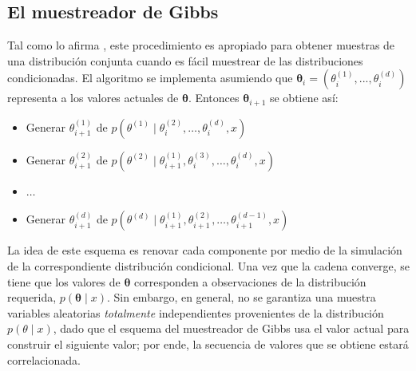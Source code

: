 \documentclass[
  10pt,
  spanish,
]{book}
\providecommand{\tightlist}{%
  \setlength{\itemsep}{0pt}\setlength{\parskip}{0pt}}
\theoremstyle{definition}
\theoremstyle{definition}
\theoremstyle{definition}
\theoremstyle{definition}
\theoremstyle{remark}
\begin{document}
\hypertarget{el-muestreador-de-gibbs}{%
\subsection{El muestreador de Gibbs}\label{el-muestreador-de-gibbs}}

Tal como lo afirma \citet{Pena2002}, este procedimiento es apropiado para obtener muestras de una distribución
conjunta cuando es fácil muestrear de las distribuciones condicionadas. El algoritmo se implementa asumiendo que \(\boldsymbol \theta_i=(\theta^{(1)}_i, . . . , \theta^{(d)}_i)\) representa a los valores actuales de \(\boldsymbol \theta\). Entonces \(\boldsymbol \theta_{i+1}\) se obtiene así:

\begin{itemize}
\tightlist
\item
  Generar \(\theta^{(1)}_{i+1}\) de \(p(\theta^{(1)} \mid \theta^{(2)}_i, \ldots,\theta^{(d)}_i,x)\)
\item
  Generar \(\theta^{(2)}_{i+1}\) de \(p(\theta^{(2)} \mid \theta^{(1)}_{i+1}, \theta^{(3)}_i, \ldots , \theta^{(d)}_i, x)\)
\item
  \(\ldots\)
\item
  Generar \(\theta^{(d)}_{i+1}\) de \(p(\theta^{(d)} \mid \theta^{(1)}_{i+1}, \theta^{(2)}_{i+1}, \ldots , \theta^{(d-1)}_{i+1} , x)\)
\end{itemize}

La idea de este esquema es renovar cada componente por medio de la simulación de la correspondiente distribución condicional. Una vez que la cadena converge, se tiene que los valores de \(\boldsymbol \theta\) corresponden a observaciones de la distribución requerida, \(p(\boldsymbol \theta\mid x)\). Sin embargo, en general, no se garantiza una muestra variables aleatorias \emph{totalmente} independientes provenientes de la distribución \(p(\theta \mid x)\), dado que el esquema del muestreador de Gibbs usa el valor actual para construir el siguiente valor; por ende, la secuencia de valores que se obtiene estará correlacionada.
\end{document}
